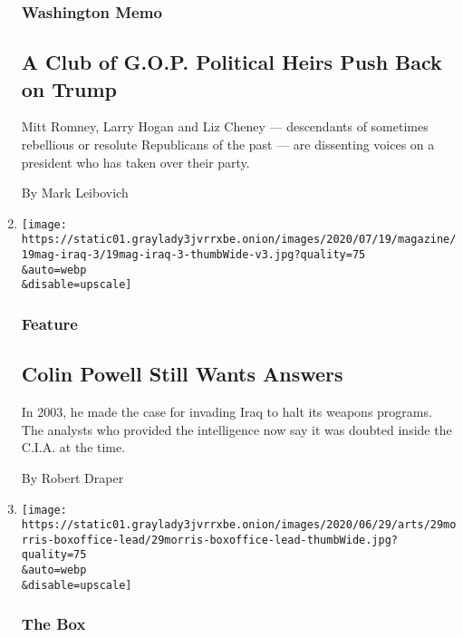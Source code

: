 \begin{enumerate}
  \hypertarget{washington-memo-1}{%
  \subsubsection{Washington Memo}\label{washington-memo-1}}

  \hypertarget{a-club-of-gop-political-heirs-push-back-on-trump}{%
  \subsection{A Club of G.O.P. Political Heirs Push Back on
  Trump}\label{a-club-of-gop-political-heirs-push-back-on-trump}}

  Mitt Romney, Larry Hogan and Liz Cheney --- descendants of sometimes
  rebellious or resolute Republicans of the past --- are dissenting
  voices on a president who has taken over their party.

  By Mark Leibovich
\item
  \href{/2020/07/16/magazine/colin-powell-iraq-war.html}{}

  \texttt{[image: https://static01.graylady3jvrrxbe.onion/images/2020/07/19/magazine/19mag-iraq-3/19mag-iraq-3-thumbWide-v3.jpg?quality=75\\\&auto=webp\\\&disable=upscale]}

  \hypertarget{feature}{%
  \subsubsection{Feature}\label{feature}}

  \hypertarget{colin-powell-still-wants-answers}{%
  \subsection{Colin Powell Still Wants
  Answers}\label{colin-powell-still-wants-answers}}

  In 2003, he made the case for invading Iraq to halt its weapons
  programs. The analysts who provided the intelligence now say it was
  doubted inside the C.I.A. at the time.

  By Robert Draper
\item
  \href{/2020/06/30/movies/fahrenheit-911-movie-2004.html}{}

  \texttt{[image: https://static01.graylady3jvrrxbe.onion/images/2020/06/29/arts/29morris-boxoffice-lead/29morris-boxoffice-lead-thumbWide.jpg?quality=75\\\&auto=webp\\\&disable=upscale]}

  \hypertarget{the-box}{%
  \subsubsection{The Box}\label{the-box}}


\end{enumerate}
